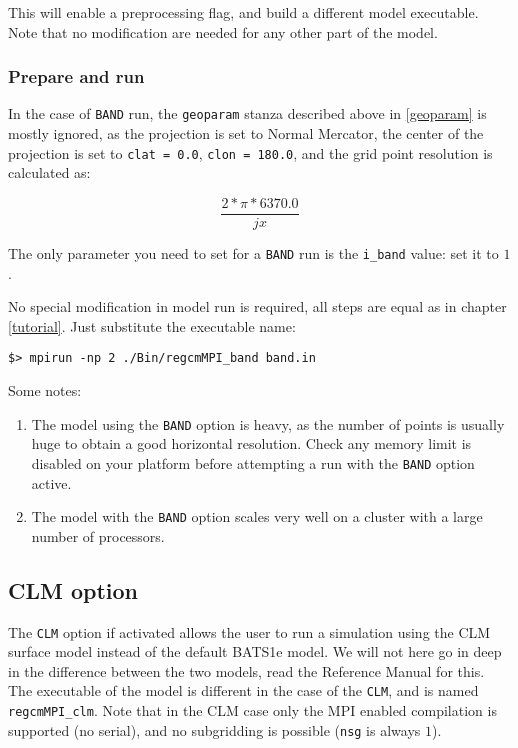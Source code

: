 This will enable a preprocessing flag, and build a different model executable.
Note that no modification are needed for any other part of the model.

\subsubsection{Prepare and run}
\label{i_band}

In the case of \verb=BAND= run, the \verb=geoparam= stanza described above in
\ref{geoparam} is mostly ignored, as the projection is set to Normal Mercator,
the center of the projection is set to \verb'clat = 0.0', \verb'clon = 180.0',
and the grid point resolution is calculated as:

\begin{equation}
\frac{2*\pi*6370.0}{jx}
\end{equation}

The only parameter you need to set for a \verb=BAND= run is the \verb=i_band=
value: set it to $1$.

No special modification in model run is required, all steps are equal as in
chapter \ref{tutorial}. Just substitute the executable name:

\begin{Verbatim}
$> mpirun -np 2 ./Bin/regcmMPI_band band.in
\end{Verbatim}

Some notes:

\begin{enumerate}
\item The model using the \verb=BAND= option is heavy, as the number of points
is usually huge to obtain a good horizontal resolution. Check any memory
limit is disabled on your platform before attempting a run with the \verb=BAND=
option active.
\item The model with the \verb=BAND= option scales very well on a cluster
with a large number of processors.
\end{enumerate}

\subsection{CLM option}
\label{clm}

The \verb=CLM= option if activated allows the user to run a simulation using
the CLM surface model instead of the default BATS1e model. We will not here go
in deep in the difference between the two models, read the Reference Manual
for this.
The executable of the model is different in the case of the \verb=CLM=, and is
named \verb=regcmMPI_clm=.
Note that in the CLM case only the MPI enabled compilation is supported (no
serial), and no subgridding is possible (\verb=nsg= is always $1$).

